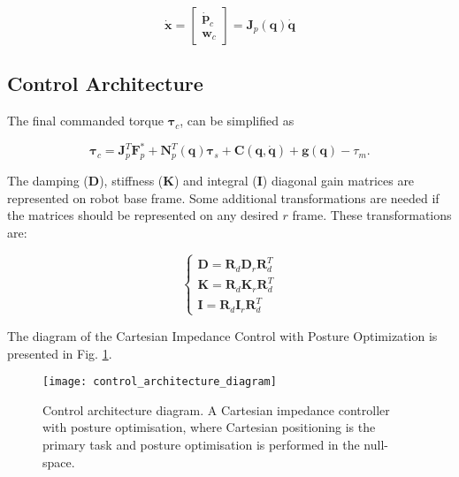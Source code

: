 \begin{equation}
    \label{eq:cartesian_velocities_calculation}
    \boldsymbol{\dot{x}} = \begin{bmatrix}
        \boldsymbol{\dot{p}}_c\\
        \boldsymbol{w}_c
    \end{bmatrix} = \boldsymbol{J}_p(\boldsymbol{q}) \boldsymbol{\dot{q}}
\end{equation}


\subsection{Control Architecture}
\label{subsec:control_architectures_cartesian_impedance_posture_optimisation_architecture}

The final commanded torque $\boldsymbol{\tau}_c$, can be simplified as

\begin{equation}
    \boldsymbol{\tau}_c = \boldsymbol{J}^T_p \boldsymbol{F}^*_p + \boldsymbol{N}^T_p(\boldsymbol{q}) \boldsymbol{\tau}_s + \boldsymbol{C}(\boldsymbol{q}, \boldsymbol{\dot{q}}) + \boldsymbol{g}(\boldsymbol{q}) - \tau_m.
\end{equation}

The damping ($\boldsymbol{D}$), stiffness ($\boldsymbol{K}$) and integral ($\boldsymbol{I}$) diagonal gain matrices are represented on robot base frame. Some additional transformations are needed if the matrices should be represented on any desired $r$ frame. These transformations are:

\begin{equation}
    \begin{cases}
        \boldsymbol{D} = \boldsymbol{R}_d \boldsymbol{D}_r \boldsymbol{R}^T_d\\ \boldsymbol{K} = \boldsymbol{R}_d \boldsymbol{K}_r \boldsymbol{R}^T_d\\ \boldsymbol{I} = \boldsymbol{R}_d \boldsymbol{I}_r \boldsymbol{R}^T_d
    \end{cases}
\end{equation}

The diagram of the Cartesian Impedance Control with Posture Optimization is presented in Fig. \ref{fig:control_architecture_diagram}.

\begin{figure}[htbp]
	\centering
	\texttt{[image: control\_architecture\_diagram]}
	\caption[Control architecture diagram.]{Control architecture diagram. A Cartesian impedance controller with posture optimisation, where Cartesian positioning is the primary task and posture optimisation is performed in the null-space. \cite{Ochoa2019_control_architecture_robotic_polishing}}
	\label{fig:control_architecture_diagram}
\end{figure}


